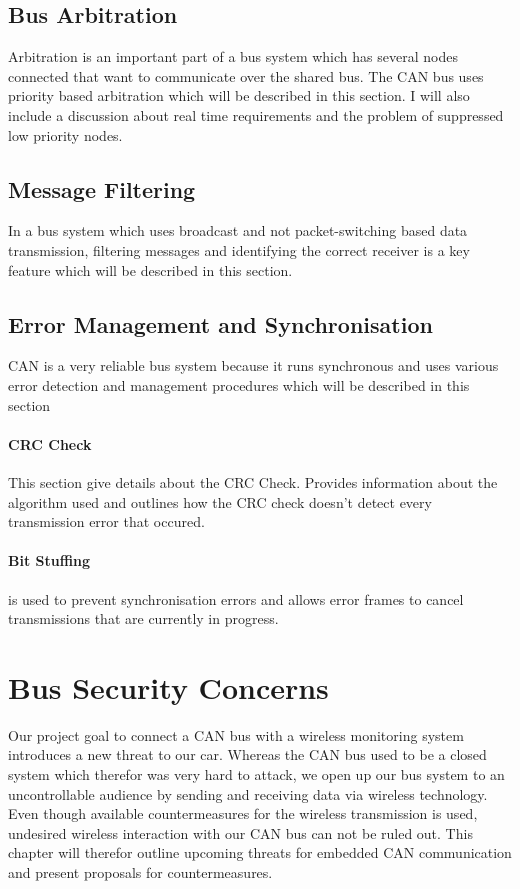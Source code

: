 \subsection{Bus Arbitration}
Arbitration is an important part of a bus system which has several nodes
connected that want to communicate over the shared bus. The CAN bus uses
priority based arbitration which will be described in this section. I will also
include a discussion about real time requirements and the problem of suppressed
low priority nodes.
\subsection{Message Filtering}
In a bus system which uses broadcast and not packet-switching based data
transmission, filtering messages and identifying the correct receiver is a key
feature which will be described in this section.
\subsection{Error Management and Synchronisation}
CAN is a very reliable bus system because it runs synchronous and uses various
error detection and management procedures which will be described in this
section
	\paragraph{CRC Check}
	This section give details about the CRC Check. Provides information about the
	algorithm used and outlines how the CRC check doesn't detect every transmission
	error that occured.
	\paragraph{Bit Stuffing}
	is used to prevent synchronisation errors and allows error frames
	to cancel transmissions that are currently in progress.

\section{Bus Security Concerns}
Our project goal to connect a CAN bus with a wireless monitoring system
introduces a new threat to our car. Whereas the CAN bus used to be a closed
system which therefor was very hard to attack, we open up our bus
system to an uncontrollable audience by sending and receiving data via wireless
technology. Even though available countermeasures for the wireless
transmission is used, undesired wireless interaction with our CAN bus can not be
ruled out. This chapter will therefor outline upcoming threats for embedded CAN
communication and present proposals for countermeasures.

